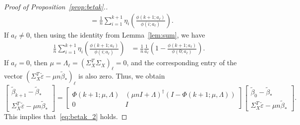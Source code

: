 \documentclass[11pt]{article}
\begin{document}
\begin{proof}[Proof of Proposition~\ref{prop:betak}.]
\begin{align}
    &= \frac{1}{n}\sum_{i=1}^{k+1}\eta_i\left(\frac{\phi(k+1; a_\ell)}{\phi(i; a_\ell)}\right).
\end{align}
If $a_{\ell} \ne 0$, then using the identity from Lemma~\ref{lem:sum}, we have
\begin{align*}
    \frac{1}{n}\sum_{i=1}^{k+1}\eta_i\left(\frac{\phi(k+1; a_\ell)}{\phi(i; a_\ell)}\right)
    &= \frac{1}{n} \frac{1}{a_\ell}\left(1 - \frac{\phi(k+1; a_\ell)}{\phi(0; a_\ell)}\right).
\end{align*}
If $a_{\ell} = 0$, then $\mu = \Lambda_{\ell} = (\Sigma_X^T \Sigma_X)_\ell = 0$, and the corresponding entry of the vector $(\Sigma_X^T\check{\varepsilon} - \mu n \tilde{\beta}_*)_{\ell}$ is also zero.
Thus, we obtain
\[
    \begin{bmatrix} \tilde{\beta}_{k+1} - \tilde{\beta}_* \\ \Sigma_X^T\check{\varepsilon} - \mu n \tilde{\beta}_* 
    \end{bmatrix} = \begin{bmatrix} \Phi(k+1; \mu, \Lambda) & \left(\mu n I + \Lambda\right)^{\dagger}(I - \Phi(k+1; \mu, \Lambda))\\ 0 & I \end{bmatrix} \begin{bmatrix} \tilde{\beta}_{0} - \tilde{\beta}_* \\ \Sigma_X^T\check{\varepsilon} - \mu n \tilde{\beta}_*
    \end{bmatrix}.
\]
This implies that~\eqref{eq:betak_2} holds.


\end{proof}
\end{document}
